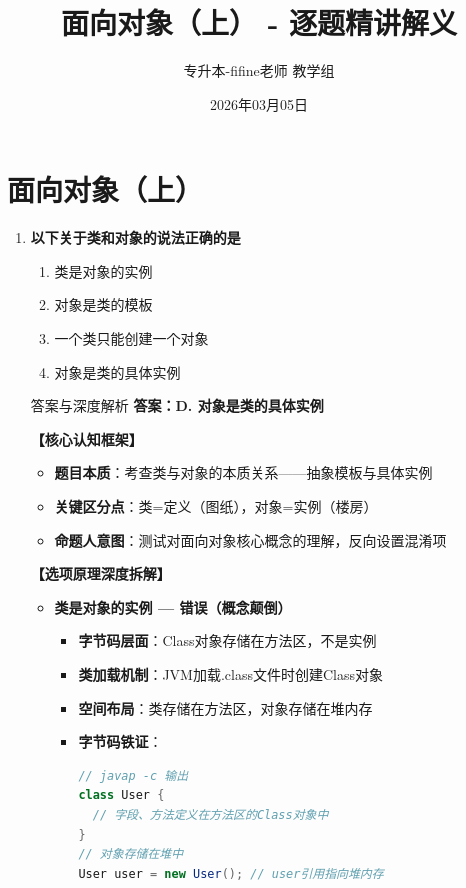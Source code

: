 \documentclass[12pt, a4paper]{ctexart}
\title{\textcolor{myblue}{\textbf{面向对象（上） - 逐题精讲解义}}}
\author{专升本-fifine老师 教学组}
\date{2026年03月05日}
\begin{document}
\maketitle
\thispagestyle{empty}
\newpage

\section{面向对象（上）}

\begin{enumerate}[label=\textbf{\arabic*.}]

	\item \textbf{以下关于类和对象的说法正确的是}
	      \begin{enumerate}[label=\Alph*.]
		      \item 类是对象的实例
		      \item 对象是类的模板
		      \item 一个类只能创建一个对象
		      \item 对象是类的具体实例
	      \end{enumerate}

	      \begin{bluebox}{答案与深度解析}
		      \textbf{答案：D. 对象是类的具体实例}

		      \textbf{【核心认知框架】}
		      \begin{itemize}[label={}, leftmargin=*, nosep]
			      \item \textbf{题目本质}：考查类与对象的本质关系——抽象模板与具体实例
			      \item \textbf{关键区分点}：类=定义（图纸），对象=实例（楼房）
			      \item \textbf{命题人意图}：测试对面向对象核心概念的理解，反向设置混淆项
		      \end{itemize}

		      \textbf{【选项原理深度拆解】}

		      \begin{itemize}[leftmargin=*, nosep, label={}]
			      \item[A] \textbf{类是对象的实例 — 错误（概念颠倒）}
			            \begin{itemize}[label={}, leftmargin=*, nosep]
				            \item \textbf{字节码层面}：Class对象存储在方法区，不是实例
				            \item \textbf{类加载机制}：JVM加载.class文件时创建Class对象
				            \item \textbf{空间布局}：类存储在方法区，对象存储在堆内存
				            \item \textbf{字节码铁证}：
				                  \begin{lstlisting}[language=Java]
// javap -c 输出
class User {
  // 字段、方法定义在方法区的Class对象中
}
// 对象存储在堆中
User user = new User(); // user引用指向堆内存
				            \end{lstlisting}
			            \end{itemize}


\end{itemize}
\end{bluebox}
\end{enumerate}
\end{document}
